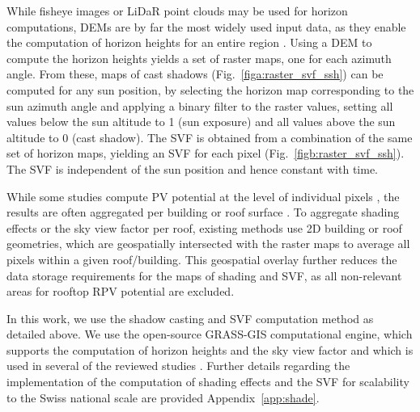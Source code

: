 While fisheye images \cite{calcabrini_simplified_2019} or LiDaR point clouds \cite{bill_3d_2016,jakubiec_method_2013} may be used for horizon computations, DEMs are by far the most widely used input data, as they enable the computation of horizon heights for an entire region \cite{suri_new_2004}.
Using a DEM to compute the horizon heights yields a set of raster maps, one for each azimuth angle.
From these, maps of cast shadows (Fig.~\ref{figa:raster_svf_ssh}) can be computed for any sun position, by selecting the horizon map corresponding to the sun azimuth angle and applying a binary filter to the raster values, setting all values below the sun altitude to 1 (sun exposure) and all values above the sun altitude to 0 (cast shadow).
%
The SVF is obtained from a combination of the same set of horizon maps, yielding an SVF for each pixel (Fig.~\ref{figb:raster_svf_ssh}). The SVF is independent of the sun position and hence constant with time. 

While some studies compute PV potential at the level of individual pixels \cite{buffat_scalable_2018,ramirez_camargo_spatio-temporal_2015}, the results are often aggregated per building or roof surface \cite{assouline_quantifying_2017,assouline_large-scale_2018,klauser_solarpotentialanalyse_2016}. To aggregate shading effects or the sky view factor per roof, existing methods use 2D building or roof geometries, which are geospatially intersected with the raster maps to average all pixels within a given roof/building. This geospatial overlay further reduces the data storage requirements for the maps of shading and SVF, as all non-relevant areas for rooftop RPV potential are excluded.

In this work, we use the shadow casting and SVF computation method as detailed above. We use the open-source GRASS-GIS computational engine, which supports the computation of horizon heights \cite{suri_new_2004} and the sky view factor \cite{zaksek_sky-view_2011} and which is used in several of the reviewed studies \cite{ramirez_camargo_spatio-temporal_2015,nguyen_incorporating_2012,buffat_scalable_2018}. 
Further details regarding the implementation of the computation of shading effects and the SVF for scalability to the Swiss national scale are provided Appendix~\ref{app:shade}.

